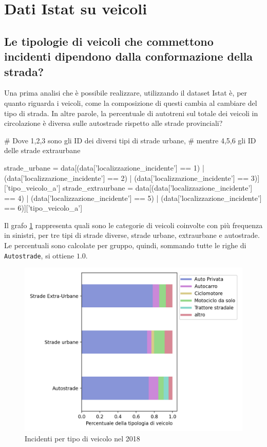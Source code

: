 \documentclass[a4paper,12pt]{report}
\newcommand{\columnstyle}[1]{\texttt{#1}}
\begin{document}
\section{Dati Istat su veicoli}

\subsection{Le tipologie di veicoli che commettono incidenti dipendono dalla conformazione della strada?}

Una prima analisi che è possibile realizzare, utilizzando il dataset Istat è, 
per quanto riguarda i veicoli, 
come la composizione di questi cambia al cambiare del tipo di strada. 
In altre parole, la percentuale di autotreni sul totale dei veicoli 
in circolazione è diversa sulle autostrade rispetto alle strade provinciali?

\begin{code}[language=Python]
# Dove 1,2,3 sono gli ID dei diversi tipi di strade urbane, 
# mentre 4,5,6 gli ID delle strade extraurbane

strade_urbane = data[(data['localizzazione_incidente'] == 1) | (data['localizzazione_incidente'] == 2) | (data['localizzazione_incidente'] == 3)]['tipo_veicolo_a']
strade_extraurbane = data[(data['localizzazione_incidente'] == 4) | (data['localizzazione_incidente'] == 5) | (data['localizzazione_incidente'] == 6)]['tipo_veicolo_a']
\end{code}

Il grafo \ref{fig:differenza-strade} rappresenta quali sono le categorie di veicoli 
coinvolte con più frequenza in sinistri, per tre tipi di strade diverse, strade urbane, 
extraurbane e autostrade. 
Le percentuali sono calcolate per gruppo, quindi, sommando 
tutte le righe di \columnstyle{Autostrade}, si ottiene $1.0$. 

\begin{figure}
    \includegraphics[width=\linewidth]{../src/incidenti/incidenti_senza_coords/tipo_veicoli/differenza_strade.png}
    \caption{Incidenti per tipo di veicolo nel 2018}
    \label{fig:differenza-strade}
\end{figure}
\end{document}
